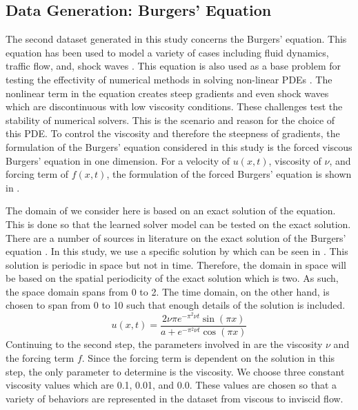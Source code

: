 \subsection{Data Generation: Burgers' Equation}\label{sec:data_generation_burgers}
\noindent The second dataset generated in this study concerns the Burgers' equation. This equation has been used to model a variety of cases including fluid dynamics, traffic flow, and, shock waves \autocite{bonkileSystematicLiteratureReview2018,orlandiBurgersEquation2000,becBurgersTurbulence2007,jamesonEnergyEstimatesNonlinear2007}. This equation is also used as a base problem for testing the effectivity of numerical methods in solving non-linear PDEs \autocite{barterShockCapturingPDEbased2008,banksNumericalErrorEstimation2012, tabatabaeiImplicitMethodsNumerical2007,bonkileSystematicLiteratureReview2018}. The nonlinear term in the equation creates steep gradients and even shock waves which are discontinuous with low viscosity conditions. These challenges test the stability of numerical solvers. This is the scenario and reason for the choice of this PDE\@. To control the viscosity and therefore the steepness of gradients, the formulation of the Burgers' equation considered in this study is the forced viscous Burgers' equation in one dimension. For a velocity of \(u(x, t)\), viscosity of \(\nu \), and forcing term of \(f(x, t)\), the formulation of the forced Burgers' equation is shown in .

The domain of we consider here is based on an exact solution of the equation. This is done so that the learned solver model can be tested on the exact solution. There are a number of sources in literature on the exact solution of the Burgers' equation \autocite{bentonTableSolutionsOnedimensional1972,wazwazPartialDifferentialEquations2010,woodExactSolutionBurgers2006}. In this study, we use a specific solution by \textcite{woodExactSolutionBurgers2006} which can be seen in . This solution is periodic in space but not in time. Therefore, the domain in space will be based on the spatial periodicity of the exact solution which is two. As such, the space domain spans from 0 to 2. The time domain, on the other hand, is chosen to span from 0 to 10 such that enough details of the solution is included.
\begin{equation}
  u(x,t) = \frac{2\nu\pi e^{-\pi^2\nu t}\sin(\pi x)}{a+e^{-\pi^2\nu t}\cos(\pi x)} \label{eq:burgers_exact_solution}
\end{equation}
Continuing to the second step, the parameters involved in  are the viscosity \(\nu \) and the forcing term \(f \). Since the forcing term is dependent on the solution in this step, the only parameter to determine is the viscosity. We choose three constant viscosity values which are \num{0.1}, \num{0.01}, and \num{0.0}. These values are chosen so that a variety of behaviors are represented in the dataset from viscous to inviscid flow.

